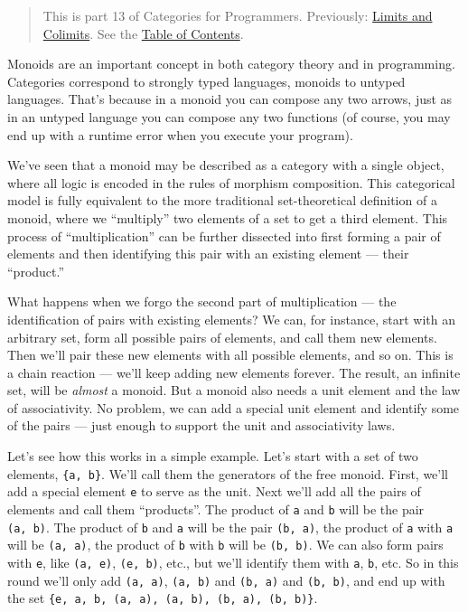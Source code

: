 \begin{quote}
This is part 13 of Categories for Programmers. Previously:
\href{https://bartoszmilewski.com/2015/04/15/limits-and-colimits/}{Limits
and Colimits}. See the
\href{https://bartoszmilewski.com/2014/10/28/category-theory-for-programmers-the-preface/}{Table
of Contents}.
\end{quote}

Monoids are an important concept in both category theory and in
programming. Categories correspond to strongly typed languages, monoids
to untyped languages. That's because in a monoid you can compose any two
arrows, just as in an untyped language you can compose any two functions
(of course, you may end up with a runtime error when you execute your
program).

We've seen that a monoid may be described as a category with a single
object, where all logic is encoded in the rules of morphism composition.
This categorical model is fully equivalent to the more traditional
set-theoretical definition of a monoid, where we ``multiply'' two
elements of a set to get a third element. This process of
``multiplication'' can be further dissected into first forming a pair of
elements and then identifying this pair with an existing element ---
their ``product.''

What happens when we forgo the second part of multiplication --- the
identification of pairs with existing elements? We can, for instance,
start with an arbitrary set, form all possible pairs of elements, and
call them new elements. Then we'll pair these new elements with all
possible elements, and so on. This is a chain reaction --- we'll keep
adding new elements forever. The result, an infinite set, will be
\emph{almost} a monoid. But a monoid also needs a unit element and the
law of associativity. No problem, we can add a special unit element and
identify some of the pairs --- just enough to support the unit and
associativity laws.

Let's see how this works in a simple example. Let's start with a set of
two elements, \texttt{\{a,\ b\}}. We'll call them the generators of the
free monoid. First, we'll add a special element \texttt{e} to serve as
the unit. Next we'll add all the pairs of elements and call them
``products''. The product of \texttt{a} and \texttt{b} will be the pair
\texttt{(a,\ b)}. The product of \texttt{b} and \texttt{a} will be the
pair \texttt{(b,\ a)}, the product of \texttt{a} with \texttt{a} will be
\texttt{(a,\ a)}, the product of \texttt{b} with \texttt{b} will be
\texttt{(b,\ b)}. We can also form pairs with \texttt{e}, like
\texttt{(a,\ e)}, \texttt{(e,\ b)}, etc., but we'll identify them with
\texttt{a}, \texttt{b}, etc. So in this round we'll only add
\texttt{(a,\ a)}, \texttt{(a,\ b)} and \texttt{(b,\ a)} and
\texttt{(b,\ b)}, and end up with the set
\texttt{\{e,\ a,\ b,\ (a,\ a),\ (a,\ b),\ (b,\ a),\ (b,\ b)\}}.

